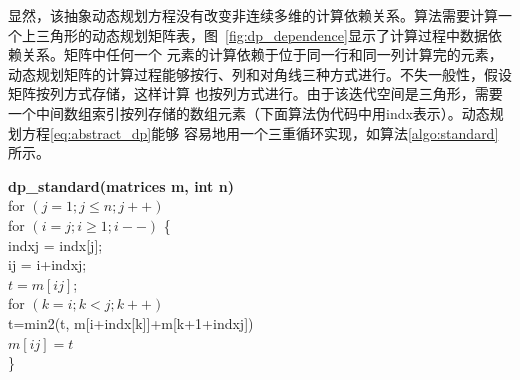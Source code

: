 \begin{flushleft}
显然，该抽象动态规划方程没有改变非连续多维的计算依赖关系。算法需要计算一个上三角形的动态规划矩阵表，图~\ref{fig:dp_dependence}显示了计算过程中数据依赖关系。矩阵中任何一个
元素的计算依赖于位于同一行和同一列计算完的元素，动态规划矩阵的计算过程能够按行、列和对角线三种方式进行。不失一般性，假设矩阵按列方式存储，这样计算
也按列方式进行。由于该迭代空间是三角形，需要一个中间数组索引按列存储的数组元素（下面算法伪代码中用indx表示）。动态规划方程\ref{eq:abstract_dp}能够
容易地用一个三重循环实现，如算法\ref{algo:standard}所示。
\begin{algorithm}\label{algo:standard}
	{\bf dp\_standard(matrices m, int n)}\\
	for $(j=1; j \leq n; j++)$\\
	\hspace*{1 pc}for $(i=j; i \geq 1; i--)$ \{\\
	\hspace*{2 pc}indxj = indx[j]; \\
	\hspace*{2 pc}ij = i+indxj;\\
	\hspace*{2 pc}$t=m[ij]$;\\
	\hspace*{2 pc}for $(k=i;k<j;k++)$ \\
	\hspace*{3 pc}t=min2(t, m[i+indx[k]]+m[k+1+indxj]) \\
	\hspace*{2 pc}$m[ij]=t$ \\
	\hspace*{1 pc}\}
\end{algorithm}


\end{flushleft}
